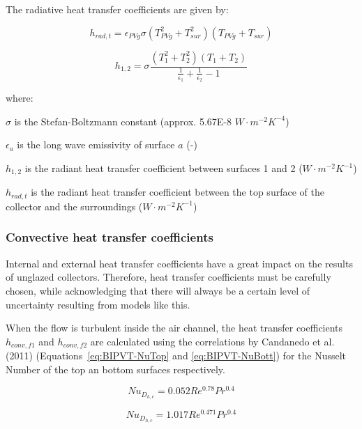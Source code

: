 {The radiative heat transfer coefficients are given by:


\begin{equation}
h_{rad,t}=\epsilon_{PVg} \sigma \left(T^{2}_{PVg}+T^{2}_{sur} \right)\left(T_{PVg}+T_{sur}\right)
\label{eq:BIPVT-h-rad-t}
\end{equation}


\begin{equation}
h_{1,2}=\sigma \frac{\left(T^{2}_{1}+T^{2}_{2} \right)\left(T_{1}+T_{2}\right)}{\frac{1}{\epsilon_{1}}+\frac{1}{\epsilon_{2}}-1}
\label{eq:BIPVT-h-rad-1-2}
\end{equation}

where:

\(\sigma\) is the Stefan-Boltzmann constant (approx. 5.67E-8 \(W\cdot m^{−2}K^{−4}\))

\(\epsilon_{a}\) is the long wave emissivity of surface \(a\) (-)

\(h_{1,2}\) is the radiant heat transfer coefficient between surfaces 1 and 2 (\(W\cdot m^{−2}K^{−1}\))

\(h_{rad,t}\) is the radiant heat transfer coefficient between the top surface of the collector and the surroundings (\(W\cdot m^{−2}K^{−1}\))

\subsubsection{Convective heat transfer coefficients}\label{BIPVT-htc-conv}

Internal and external heat transfer coefficients have a great impact on the results of unglazed collectors. Therefore, heat transfer coefficients must be carefully chosen, while acknowledging that there will always be a certain level of uncertainty resulting from models like this.

When the flow is turbulent inside the air channel, the heat transfer coefficients \(h_{conv,f1}\) and \(h_{conv,f2}\) are calculated using the correlations by Candanedo et al. (2011) (Equations~\ref{eq:BIPVT-NuTop} and \ref{eq:BIPVT-NuBott}) for the Nusselt Number of the top an bottom surfaces respectively.

\begin{equation}
Nu_{D_{h,c}}=0.052Re^{0.78}Pr^{0.4}
\label{eq:BIPVT-NuTop}
\end{equation}

\begin{equation}
Nu_{D_{h,c}}=1.017Re^{0.471}Pr^{0.4}
\label{eq:BIPVT-NuBott}
\end{equation}

}
